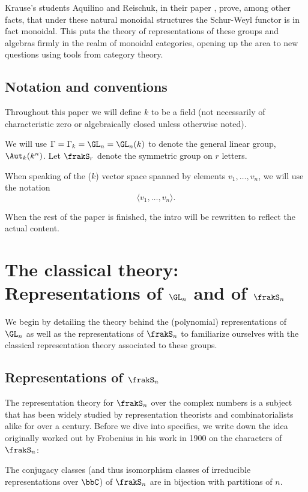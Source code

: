 \documentclass[12pt]{article}
\begin{document}
Krause's students Aquilino and Reischuk, in their paper \cite{aquilino-reischuk}, prove, among other facts, that 
under these natural monoidal structures the Schur-Weyl functor is in fact monoidal. This puts the theory of representations 
of these groups and algebras firmly in the realm of monoidal categories, opening up the area to new questions using 
tools from category theory.

\subsection{Notation and conventions}\label{subsec:notation}
Throughout this paper we will define $k$ to be a field (not necessarily of characteristic zero or algebraically closed unless otherwise noted).

We will use $\Gamma=\Gamma_k=\GL_n=\GL_n(k)$ to denote the general linear group, $\Aut_k(k^n)$. Let $\frakS_r$ denote the symmetric group on $r$ letters.

When speaking of the ($k$) vector space spanned by elements $v_1,\dots,v_n$, we will use the notation 
\[\langle v_1,\dots, v_n\rangle.\]

{\color{red} When the rest of the paper is finished, the intro will be rewritten to reflect the actual content.}


\newpage
\section{The classical theory: Representations of \texorpdfstring{$\GL_n$}{GLn} and of \texorpdfstring{$\frakS_n$}{Sn}}
We begin by detailing the theory behind the (polynomial) representations of $\GL_n$ as well as the representations of $\frakS_n$ to 
familiarize ourselves with the classical representation theory associated to these groups.

\subsection{Representations of \texorpdfstring{$\frakS_n$}{Sn}}
The representation theory for $\frakS_n$ over the complex numbers is a subject that has been widely studied by representation theorists 
and combinatorialists alike for over a century. Before we dive into specifics, we write down the idea originally worked out by Frobenius \cite{frobenius-charaktere}
in his work in 1900 on the characters of $\frakS_n$:
\begin{thm}\label{thm:frob-conj}
	The conjugacy classes (and thus isomorphism classes of irreducible representations over $\bbC$) of $\frakS_n$
	are in bijection with partitions of $n$.
\end{thm}
\end{document}
